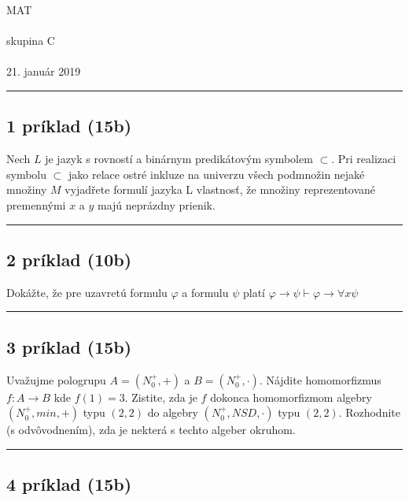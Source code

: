\documentclass[11pt,a4paper]{article}
\begin{document}
\begin{center}
  \begin{bf}
    \Huge{MAT}\\[-0.5em]
    {\normalsize{}}\\[0.5em]

    \Large{skupina C}\\[-0.25em]
    {\normalsize{}}\\[1em]

    21. január 2019
  \end{bf}
\end{center}

\hrule

\subsection*{1 príklad (15b)}

  Nech $L$ je jazyk s rovností a binárnym predikátovým symbolem $\subset$. Pri realizaci symbolu $\subset$ jako relace ostré inkluze na univerzu všech podmnožin nejaké množiny $M$ vyjadřete formulí jazyka L vlastnosť, že množiny reprezentované premennými $x$ a $y$ majú neprázdny prienik.\\

  \hrule

\subsection*{2 príklad (10b)}

  Dokážte, že pre uzavretú formulu $\varphi$ a formulu $\psi$ platí $\varphi \rightarrow \psi \vdash \varphi \rightarrow \forall x \psi$\\

  \hrule

\subsection*{3 príklad (15b)}

  Uvažujme pologrupu $A=(N_0^+,+)$ a $B=(N_0^+,\cdot)$. Nájdite homomorfizmus $f:A \rightarrow B$ kde $f(1)=3$. Zistite, zda je $f$ dokonca homomorfizmom algebry $(N_0^+, min, +)$ typu $(2,2)$ do algebry $(N_0^+, NSD, \cdot)$ typu $(2,2)$. Rozhodnite (s odvôvodnením), zda je nekterá s techto algeber okruhom.\\

  \hrule

\subsection*{4 príklad (15b)}
\end{document}
